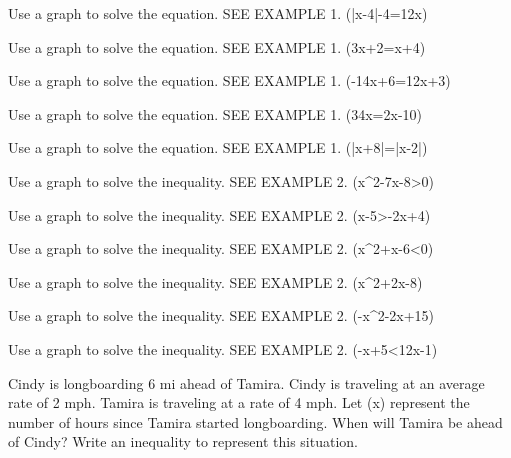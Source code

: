\documentclass{article}
\newenvironment{practice}[2]{}{}        %
\newcommand{\answer}[1]{}               %
\newcommand{\placeholder}[2]{}          %
\begin{document}
\begin{practice}{10}{1}
Use a graph to solve the equation. SEE EXAMPLE 1.
(|x-4|-4=\frac12x)
\answer{(x=0) or (x=16)}
\end{practice}
\begin{practice}{11}{1}
Use a graph to solve the equation. SEE EXAMPLE 1.
(3x+2=x+4)
\answer{(x=1)}
\end{practice}
\begin{practice}{12}{1}
Use a graph to solve the equation. SEE EXAMPLE 1.
(-\frac14x+6=\frac12x+3)
\answer{(x=4)}
\end{practice}
\begin{practice}{13}{1}
Use a graph to solve the equation. SEE EXAMPLE 1.
(\frac34x=2x-10)
\answer{(x=8)}
\end{practice}
\begin{practice}{14}{1}
Use a graph to solve the equation. SEE EXAMPLE 1.
(|x+8|=|x-2|)
\answer{(x=-3)}
\end{practice}
\begin{practice}{15}{1}
Use a graph to solve the inequality. SEE EXAMPLE 2.
(x^2-7x-8>0)
\answer{(x<-1) or (x>8)}
\end{practice}
\begin{practice}{16}{1}
Use a graph to solve the inequality. SEE EXAMPLE 2.
(x-5>-2x+4)
\answer{(x>3)}
\end{practice}
\begin{practice}{17}{1}
Use a graph to solve the inequality. SEE EXAMPLE 2.
(x^2+x-6<0)
\answer{(-3<x<2)}
\end{practice}
\begin{practice}{18}{1}
Use a graph to solve the inequality. SEE EXAMPLE 2.
(x^2+2x-8)
\answer{(-4\leq x\leq2)}
\end{practice}
\begin{practice}{19}{1}
Use a graph to solve the inequality. SEE EXAMPLE 2.
(-x^2-2x+15)
\answer{(x\leq-5) or (x\geq3)}
\end{practice}
\begin{practice}{20}{1}
Use a graph to solve the inequality. SEE EXAMPLE 2.
(-x+5<\frac12x-1)
\answer{(x>4)}
\end{practice}
\begin{practice}{21}{2}
Cindy is longboarding 6 mi ahead of Tamira. Cindy is traveling at an average rate of 2 mph. Tamira is traveling at a rate of 4 mph. Let (x) represent the number of hours since Tamira started longboarding. When will Tamira be ahead of Cindy? Write an inequality to represent this situation.
\placeholder{illustration}{Longboarding illustration. Foreground rider's feet on a longboard labeled Tamira, 4 mi/h; distant rider on road labeled Cindy, 2 mi/h. Road and landscape provide context.}
\answer{(4x>2x+6); Tamira will pass Cindy after 3 hours.}
\end{practice}
\end{document}
